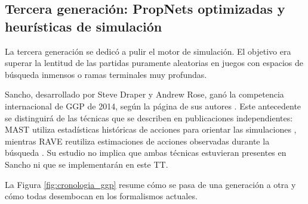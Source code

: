 \subsection{Tercera generación: PropNets optimizadas y heurísticas de simulación}

La tercera generación se dedicó a pulir el motor de simulación. El objetivo era superar la lentitud de las partidas puramente aleatorias en juegos con espacios de búsqueda inmensos o ramas terminales muy profundas.

Sancho, desarrollado por Steve Draper y Andrew Rose, ganó la competencia internacional de GGP de 2014, según la página de sus autores \cite{DraperRose2014Sancho}. Este antecedente se distinguirá de las técnicas que se describen en publicaciones independientes: MAST utiliza estadísticas históricas de acciones para orientar las simulaciones \cite{Finnsson2008CadiaPlayer}, mientras RAVE reutiliza estimaciones de acciones observadas durante la búsqueda \cite{GellySilver2011RAVE}. Su estudio no implica que ambas técnicas estuvieran presentes en Sancho ni que se implementarán en este TT.


La Figura \ref{fig:cronologia_ggp} resume cómo se pasa de una generación a otra y cómo todas desembocan en los formalismos actuales.

